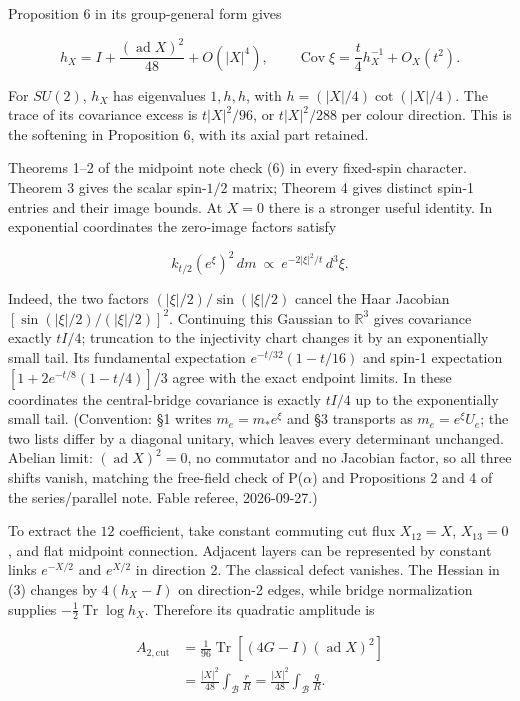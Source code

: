 \documentclass[11pt,a4paper]{article}
\begin{document}
Proposition 6 in its group-general form gives

\[h_X=I+\frac{(\operatorname{ad}X)^2}{48}+O(|X|^4),\qquad
\operatorname{Cov}\xi=\frac t4h_X^{-1}+O_X(t^2).\tag{6}\]

For \(SU(2)\), \(h_X\) has eigenvalues \(1,h,h\), with
\(h=(|X|/4)\cot(|X|/4)\). The trace of its covariance excess is
\(t|X|^2/96\), or \(t|X|^2/288\) per colour direction. This is the
softening in Proposition 6, with its axial part retained.

Theorems 1--2 of the midpoint note check (6) in every fixed-spin
character. Theorem 3 gives the scalar spin-\(1/2\) matrix; Theorem 4
gives distinct spin-1 entries and their image bounds. At \(X=0\) there
is a stronger useful identity. In exponential coordinates the zero-image
factors satisfy

\[k_{t/2}(e^\xi)^2\,dm
 \ \propto\ e^{-2|\xi|^2/t}\,d^3\xi.\tag{7}\]

Indeed, the two factors \((|\xi|/2)/\sin(|\xi|/2)\) cancel the Haar
Jacobian \([\sin(|\xi|/2)/(|\xi|/2)]^2\). Continuing this Gaussian to
\(\mathbb R^3\) gives covariance exactly \(tI/4\); truncation to the
injectivity chart changes it by an exponentially small tail. Its
fundamental expectation \(e^{-t/32}(1-t/16)\) and spin-1 expectation
\([1+2e^{-t/8}(1-t/4)]/3\) agree with the exact endpoint limits. In
these coordinates the central-bridge covariance is exactly \(tI/4\) up
to the exponentially small tail. (Convention: §1 writes \(m_e=m_*e^\xi\)
and §3 transports as \(m_e=e^\xi U_e\); the two lists differ by a
diagonal unitary, which leaves every determinant unchanged. Abelian
limit: \((\operatorname{ad}X)^2=0\), no commutator and no Jacobian
factor, so all three shifts vanish, matching the free-field check of
P(\(\alpha\)) and Propositions 2 and 4 of the series/parallel note.
Fable referee, 2026-09-27.)

To extract the \(12\) coefficient, take constant commuting cut flux
\(X_{12}=X\), \(X_{13}=0\), and flat midpoint connection. Adjacent
layers can be represented by constant links \(e^{-X/2}\) and \(e^{X/2}\)
in direction 2. The classical defect vanishes. The Hessian in (3)
changes by \(4(h_X-I)\) on direction-2 edges, while bridge normalization
supplies \(-\tfrac12\operatorname{Tr}\log h_X\). Therefore its quadratic
amplitude is

\[\begin{aligned}
A_{2,\mathrm{cut}}
 &=\frac1{96}\operatorname{Tr}
 [(4G-I)(\operatorname{ad}X)^2]\\
 &=\frac{|X|^2}{48}\int_{\mathcal B}\frac rR
 =\frac{|X|^2}{48}\int_{\mathcal B}\frac qR.
\end{aligned}\tag{8}\]
\end{document}
